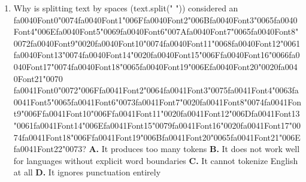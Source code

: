 \documentclass[11pt]{article}
\begin{document}
\begin{enumerate}[leftmargin=*]
  \item Why is splitting text by spaces (text.split(" ")) considered an {\csname fa0040Font0\endcsname\char"0074}{\csname fa0040Font1\endcsname\char"006F}{\csname fa0040Font2\endcsname\char"006B}{\csname fa0040Font3\endcsname\char"0065}{\csname fa0040Font4\endcsname\char"006E}{\csname fa0040Font5\endcsname\char"0069}{\csname fa0040Font6\endcsname\char"007A}{\csname fa0040Font7\endcsname\char"0065}{\csname fa0040Font8\endcsname\char"0072}{\csname fa0040Font9\endcsname\char"0020}{\csname fa0040Font10\endcsname\char"0074}{\csname fa0040Font11\endcsname\char"0068}{\csname fa0040Font12\endcsname\char"0061}{\csname fa0040Font13\endcsname\char"0074}{\csname fa0040Font14\endcsname\char"0020}{\csname fa0040Font15\endcsname\char"006F}{\csname fa0040Font16\endcsname\char"0066}{\csname fa0040Font17\endcsname\char"0074}{\csname fa0040Font18\endcsname\char"0065}{\csname fa0040Font19\endcsname\char"006E}{\csname fa0040Font20\endcsname\char"0020}{\csname fa0040Font21\endcsname\char"0070} {\csname fa0041Font0\endcsname\char"0072}{\char"006F}{\csname fa0041Font2\endcsname\char"0064}{\csname fa0041Font3\endcsname\char"0075}{\csname fa0041Font4\endcsname\char"0063}{\csname fa0041Font5\endcsname\char"0065}{\csname fa0041Font6\endcsname\char"0073}{\csname fa0041Font7\endcsname\char"0020}{\csname fa0041Font8\endcsname\char"0074}{\csname fa0041Font9\endcsname\char"006F}{\csname fa0041Font10\endcsname\char"006F}{\csname fa0041Font11\endcsname\char"0020}{\csname fa0041Font12\endcsname\char"006D}{\csname fa0041Font13\endcsname\char"0061}{\csname fa0041Font14\endcsname\char"006E}{\csname fa0041Font15\endcsname\char"0079}{\csname fa0041Font16\endcsname\char"0020}{\csname fa0041Font17\endcsname\char"0074}{\csname fa0041Font18\endcsname\char"006F}{\csname fa0041Font19\endcsname\char"006B}{\csname fa0041Font20\endcsname\char"0065}{\csname fa0041Font21\endcsname\char"006E}{\csname fa0041Font22\endcsname\char"0073}?
    \textbf{A.} It produces too many tokens
    \textbf{B.} It does not work well for languages without explicit word boundaries
    \textbf{C.} It cannot tokenize English at all
    \textbf{D.} It ignores punctuation entirely


\end{enumerate}
\end{document}
